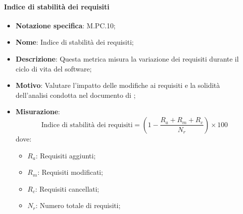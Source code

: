 \paragraph*{Indice di stabilità dei requisiti}
\begin{itemize}
    \item \textbf{Notazione specifica}: M.PC.10;
    \item \textbf{Nome}: Indice di stabilità dei requisiti;
    \item \textbf{Descrizione}: Questa metrica misura la variazione dei requisiti durante il ciclo di vita del software;
    \item \textbf{Motivo}: Valutare l'impatto delle modifiche ai requisiti e la solidità dell'analisi condotta nel documento di \AnalisiDeiRequisiti;
    \item \textbf{Misurazione}:
    \[
        \text{Indice di stabilità dei requisiti} = (1 - \frac{R_a + R_m + R_c}{N_r}) \times 100
    \]
    dove:
    \begin{itemize}
      \item $R_{a}$: Requisiti aggiunti;
      \item $R_{m}$: Requisiti modificati;
      \item $R_{c}$: Requisiti cancellati;
      \item $N_{r}$: Numero totale di requisiti;
    \end{itemize}
\end{itemize}
